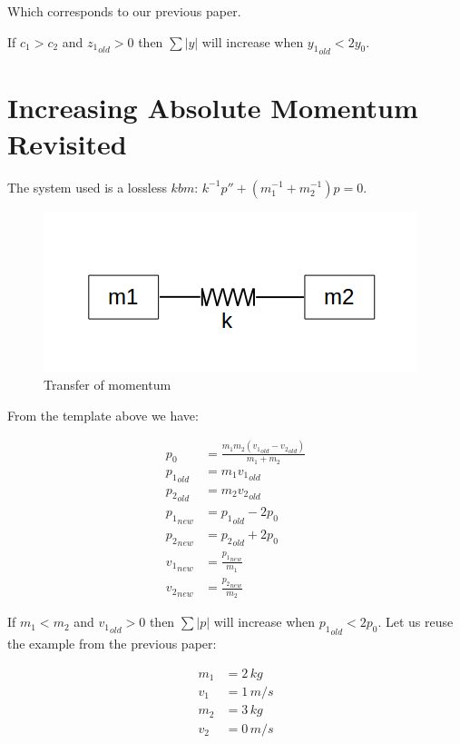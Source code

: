 \documentclass[]{../common/elementary-physics}
\begin{document}
Which corresponds to our previous paper\cite{ef1ch}.

If $c_1 > c_2$ and ${z_1}_{old} > 0$ then $\sum |y|$ will increase when ${y_1}_{old} < 2 y_0$.

\section{Increasing Absolute Momentum Revisited}

The system used is a lossless $kbm$\cite{ef3ch}: $k^{-1} p'' + (m_1^{-1} + m_2^{-1}) p = 0$.

\begin{figure}[ht] \centering
	\includegraphics[scale=.3]{mkm} \caption{Transfer of momentum}
\end{figure}

From the template above we have:

\begin{subequations}
\begin{align}
p_0 &= \frac{m_1 m_2 ({v_1}_{old}-{v_2}_{old})}{m_1 + m_2} \\
{p_1}_{old} &= m_1 {v_1}_{old} \\
{p_2}_{old} &= m_2 {v_2}_{old} \\
{p_1}_{new} &= {p_1}_{old} -2 p_0 \\
{p_2}_{new} &= {p_2}_{old} +2 p_0 \\
{v_1}_{new} &= \frac{{p_1}_{new}}{m_1} \\
{v_2}_{new} &= \frac{{p_2}_{new}}{m_2}
\end{align}
\end{subequations}

If $m_1 < m_2$ and ${v_1}_{old} > 0$ then $\sum |p|$ will increase when ${p_1}_{old} < 2 p_0$.
Let us reuse the example from the previous paper\cite{ef2ch}:

\begin{subequations}
\begin{align}
m_1 &= 2 \, kg \\
v_1 &= 1 \, m/s \\
m_2 &= 3 \, kg \\
v_2 &= 0 \, m/s
\end{align}
\end{subequations}
\end{document}
